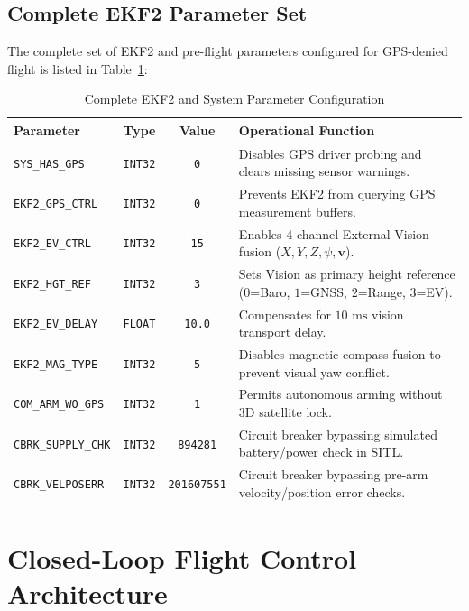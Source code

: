 \documentclass[11pt,a4paper]{article}
\begin{document}
\subsection{Complete EKF2 Parameter Set}
The complete set of EKF2 and pre-flight parameters configured for GPS-denied flight is listed in Table~\ref{tab:ekf2_params}:

\begin{table}[h!]
\centering
\small
\begin{tabularx}{\textwidth}{l c c X}
\toprule
\textbf{Parameter} & \textbf{Type} & \textbf{Value} & \textbf{Operational Function} \\
\midrule
\texttt{SYS\_HAS\_GPS} & \texttt{INT32} & \texttt{0} & Disables GPS driver probing and clears missing sensor warnings. \\
\texttt{EKF2\_GPS\_CTRL} & \texttt{INT32} & \texttt{0} & Prevents EKF2 from querying GPS measurement buffers. \\
\texttt{EKF2\_EV\_CTRL} & \texttt{INT32} & \texttt{15} & Enables 4-channel External Vision fusion ($X, Y, Z, \psi, \mathbf{v}$). \\
\texttt{EKF2\_HGT\_REF} & \texttt{INT32} & \texttt{3} & Sets Vision as primary height reference ($0$=Baro, $1$=GNSS, $2$=Range, $3$=EV). \\
\texttt{EKF2\_EV\_DELAY} & \texttt{FLOAT} & \texttt{10.0} & Compensates for $10\text{ ms}$ vision transport delay. \\
\texttt{EKF2\_MAG\_TYPE} & \texttt{INT32} & \texttt{5} & Disables magnetic compass fusion to prevent visual yaw conflict. \\
\texttt{COM\_ARM\_WO\_GPS} & \texttt{INT32} & \texttt{1} & Permits autonomous arming without 3D satellite lock. \\
\texttt{CBRK\_SUPPLY\_CHK} & \texttt{INT32} & \texttt{894281} & Circuit breaker bypassing simulated battery/power check in SITL. \\
\texttt{CBRK\_VELPOSERR} & \texttt{INT32} & \texttt{201607551} & Circuit breaker bypassing pre-arm velocity/position error checks. \\
\bottomrule
\end{tabularx}
\caption{Complete EKF2 and System Parameter Configuration}
\label{tab:ekf2_params}
\end{table}

\section{Closed-Loop Flight Control Architecture}
\end{document}
